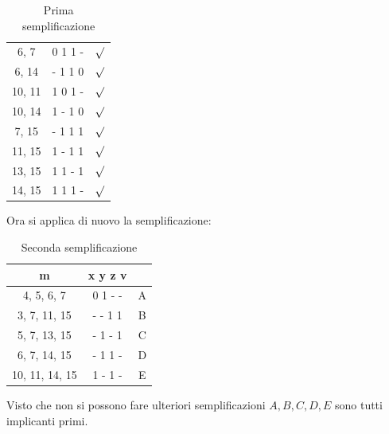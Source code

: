 \documentclass[a4paper]{article}
\theoremstyle{break}
\theoremstyle{break}
\theoremstyle{break}
\theoremstyle{break}
\begin{document}
\begin{example}
\begin{table}[H]
\begin{center}
\begin{tabular}{c|c|c}
                    6, 7 & 0 1 1 -& \( \surd \) \\
                    6, 14 & - 1 1 0& \( \surd \) \\
                    10, 11 & 1 0 1 -& \( \surd \) \\
                    10, 14 & 1 - 1 0& \( \surd \) \\
                    \hline
                    7, 15 & - 1 1 1& \( \surd \) \\
                    11, 15 & 1 - 1 1& \( \surd \) \\
                    13, 15 & 1 1 - 1& \( \surd \) \\
                    14, 15 & 1 1 1 -& \( \surd \) \\
                \end{tabular}
            \end{center}
            \caption{Prima semplificazione}
        \end{table}
        Ora si applica di nuovo la semplificazione:
        \begin{table}[H]
            \begin{center}
                \begin{tabular}{c|c|c}
                    m & x y z v&\\
                    \hline
                    4, 5, 6, 7 & 0 1 - -& A\\
                    \hline
                    3, 7, 11, 15 & - - 1 1& B\\
                    5, 7, 13, 15 & - 1 - 1& C\\
                    6, 7, 14, 15 & - 1 1 -& D\\
                    10, 11, 14, 15 & 1 - 1 -& E\\
                \end{tabular}
            \end{center}
            \caption{Seconda semplificazione}
        \end{table}
        Visto che non si possono fare ulteriori semplificazioni \( A, B, C, D, E \)
        sono tutti implicanti primi.


\end{example}
\end{document}
